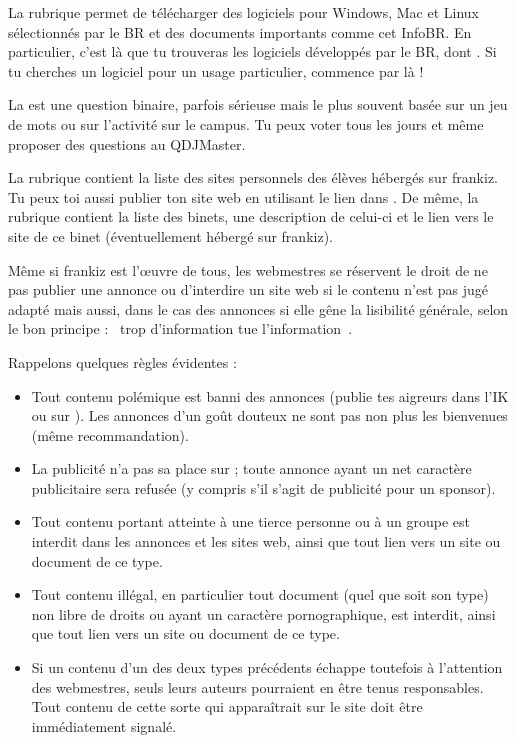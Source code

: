 La rubrique  permet de télécharger des logiciels pour
Windows, Mac et Linux sélectionnés par le BR et des documents
importants comme cet InfoBR. En particulier, c'est là que tu
trouveras les logiciels développés par le BR, dont . Si
tu cherches un logiciel pour un usage particulier, commence par là !


La  est une question binaire, parfois sérieuse mais le
plus souvent basée sur un jeu de mots ou sur l'activité sur le
campus. Tu peux voter tous les jours et même proposer des questions
au QDJMaster.

La rubrique  contient la liste des sites personnels des élèves hébergés sur frankiz. Tu peux toi aussi publier ton site web en
utilisant le lien dans . De même, la rubrique  contient la liste des binets, une description de celui-ci et le lien
vers le site de ce binet (éventuellement hébergé sur frankiz).

Même si frankiz est l'\oe uvre de tous, les webmestres se réservent le droit de ne pas publier une annonce ou d'interdire un site web si le contenu
n'est pas jugé adapté mais aussi, dans le cas des annonces si elle gêne la lisibilité générale, selon le bon principe : \guillemotleft~trop
d'information tue l'information~\guillemotright .

Rappelons quelques règles évidentes :
\begin{itemize}
 \item Tout contenu polémique est banni des annonces (publie tes aigreurs dans l'IK ou sur ).
       Les annonces d'un go\^ut douteux ne sont pas non plus les bienvenues (même recommandation).
 \item La publicité n'a pas sa place sur \fkz ; toute annonce ayant un net caractère publicitaire
       sera refusée (y compris s'il s'agit de publicité pour un sponsor).
 \item Tout contenu portant atteinte à une tierce personne ou à un groupe est interdit dans les annonces
       et les sites web, ainsi que tout lien vers un site ou document de ce type.
 \item Tout contenu illégal, en particulier tout document (quel que soit son type)
       non libre de droits ou ayant un caractère pornographique, est interdit,
       ainsi que tout lien vers un site ou document de ce type.
 \item Si un contenu d'un des deux types précédents échappe toutefois à l'attention des webmestres,
       seuls leurs auteurs pourraient en être tenus responsables.
       Tout contenu de cette sorte qui apparaîtrait sur le site doit être immédiatement signalé.
\end{itemize}

